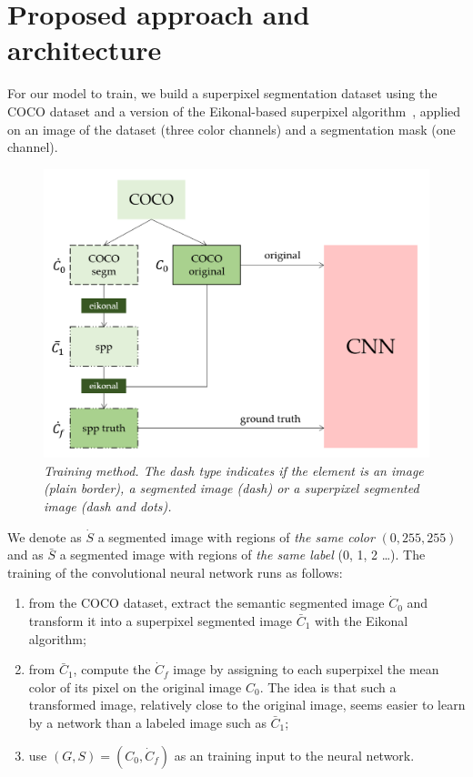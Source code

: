 \documentclass{article}
\begin{document}
\section{Proposed approach and architecture}
    For our model to train, we build a superpixel segmentation dataset using the COCO dataset and a version of the Eikonal-based superpixel algorithm~\cite{figliuzzi2019}, applied on an image of the dataset (three color channels) and a segmentation mask (one channel).
    \begin{figure}[!ht]
        \centering
        \includegraphics[width=.7\linewidth]{pics/schema-train.png}
        \caption{\textit{Training method. The dash type indicates if the element is an image (plain border), a segmented image (dash) or a superpixel segmented image (dash and dots).}}
    \end{figure}
    \par
    We denote as $\dot S$ a segmented image with regions of \textit{the same color} $(0, 255, 255)$  and as $\bar S$ a segmented image with regions of \textit{the same label} (0, 1, 2 \dots). The training of the convolutional neural network runs as follows:
    \begin{enumerate}
        \item from the COCO dataset, extract the semantic segmented image $\dot C_0$ and transform it into a superpixel segmented image $\bar C_1$ with the Eikonal algorithm;
        \item from $\bar C_1$, compute the $\dot C_f$ image by assigning to each superpixel the mean color of its pixel on the original image $C_0$. The idea is that such a transformed image, relatively close to the original image, seems easier to learn by a network than a labeled image such as $\bar C_1$;
        \item use $(G,S)=(C_0, \dot C_f)$ as an training input to the neural network.
    \end{enumerate}
\end{document}
